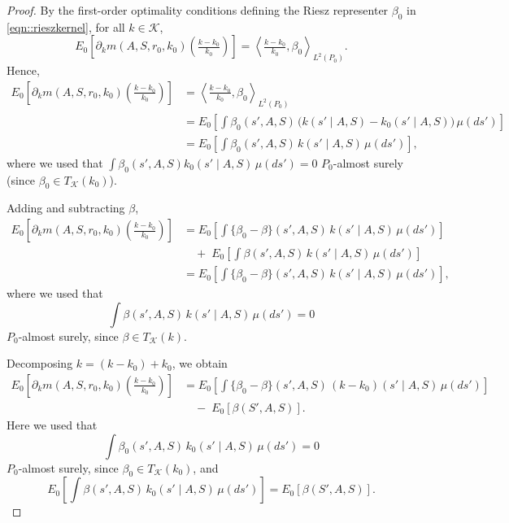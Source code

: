 \documentclass[11pt]{article}
\theoremstyle{plain}
\begin{document}
\begin{proof}
By the first-order optimality conditions defining the Riesz representer 
$\beta_0$ in \eqref{eqn::rieszkernel}, for all $k \in \mathcal{K}$,
\[
E_0\!\left[\partial_k m(A,S,r_0,k_0)\!\left(\tfrac{k-k_0}{k_0}\right)\right] 
= \left\langle \tfrac{k - k_0}{k_0}, \beta_0 \right\rangle_{L^2(P_0)}.
\]
Hence,
\begin{align*}
E_0\!\left[\partial_k m(A,S,r_0,k_0)\!\left(\tfrac{k - k_0}{k_0}\right)\right] 
&= \left\langle \tfrac{k - k_0}{k_0}, \beta_0 \right\rangle_{L^2(P_0)} \\[4pt]
&= E_0\!\left[ \int \beta_0(s',A,S)\,
\big(k(s'\!\mid\!A,S) - k_0(s'\!\mid\!A,S)\big)\,\mu(ds') \right] \\[4pt]
&= E_0\!\left[ \int \beta_0(s',A,S)\,k(s'\!\mid\!A,S)\,\mu(ds') \right],
\end{align*}
where we used that 
\(
\int \beta_0(s',A,S) k_0(s' \mid A, S)\,\mu(ds') = 0
\)
$P_0$-almost surely (since $\beta_0 \in T_{\mathcal K}(k_0)$).

Adding and subtracting $\beta$,
\begin{align*}
E_0\!\left[\partial_k m(A,S,r_0,k_0)\!\left(\tfrac{k - k_0}{k_0}\right)\right] 
&= 
E_0\!\left[
    \int 
        \Bigg\{
            \beta_0
            - 
            \beta
        \Bigg\}(s',A,S)\,
        k(s' \mid A,S)\,
    \mu(ds')
\right]  \\
&\quad
+\;
E_0\!\left[
    \int 
        \beta(s',A,S)\,
        k(s' \mid A,S)\,
    \mu(ds')
\right] 
\\[6pt]
&=
E_0\!\left[
    \int 
        \Bigg\{
            \beta_0
            - 
            \beta
        \Bigg\}(s',A,S)\,
        k(s' \mid A,S)\,
    \mu(ds')
\right],
\end{align*}
where we used that
\[
\int \beta(s',A,S)\,k(s' \mid A,S)\,\mu(ds') = 0
\]
$P_0$-almost surely, since $\beta \in T_{\mathcal K}(k)$.

Decomposing $k = (k-k_0)+k_0$, we obtain
\begin{align*}
E_0\!\left[\partial_k m(A,S,r_0,k_0)\!\left(\tfrac{k - k_0}{k_0}\right)\right] 
&= 
E_0\!\left[
    \int 
        \Bigg\{
            \beta_0
            - 
            \beta
        \Bigg\}(s',A,S)\,
        (k - k_0)(s' \mid A,S)\,
    \mu(ds')
\right] \\
&\quad
-\;
E_0\!\left[
    \beta(S',A,S)
\right].
\end{align*}
Here we used that
\[
\int \beta_0(s',A,S)\,k_0(s'\!\mid\!A,S)\,\mu(ds') = 0
\]
$P_0$-almost surely, since $\beta_0 \in T_{\mathcal K}(k_0)$, and
\[
E_0\!\left[\int \beta(s',A,S)\,k_0(s'\!\mid\!A,S)\,\mu(ds')\right]
= E_0[\beta(S',A,S)].
\]


\end{proof}
\end{document}
